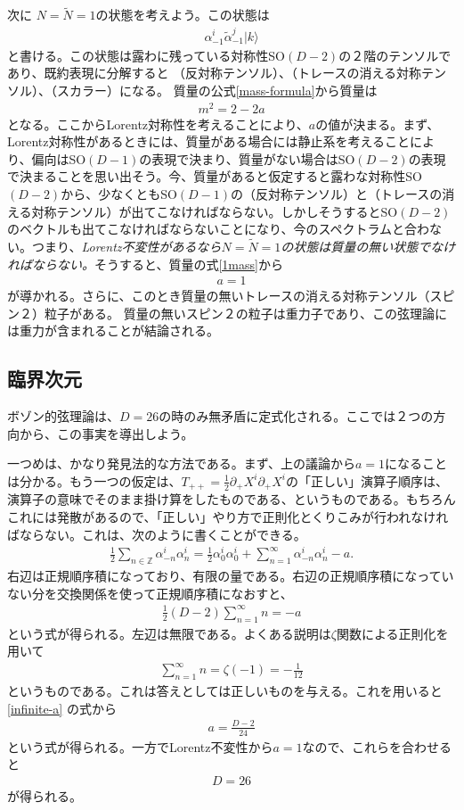 \documentclass[report,paper=a4, fontsize=12pt, line_length=16cm, number_of_lines=33,dvipdfmx]{jlreq}
\numberwithin{equation}{chapter}
\numberwithin{equation}{section}
\newcommand{\Zb}{\mathbb{Z}}
\newcommand{\del}{\partial}
\newcommand{\alphat}{\tilde{\alpha}}
\newcommand{\Nt}{\widetilde{N}}
\begin{document}
次に $N=\Nt=1$の状態を考えよう。この状態は
\begin{align}
\alpha^i_{-1}\alphat^{j}_{-1}|k\rangle
\end{align}
と書ける。この状態は露わに残っている対称性SO$(D-2)$の２階のテンソルであり、既約表現に分解すると
（反対称テンソル）、（トレースの消える対称テンソル）、（スカラー）になる。
質量の公式\eqref{mass-formula}から質量は
\begin{align}
m^2=2-2a\label{1mass}
\end{align}
となる。ここからLorentz対称性を考えることにより、$a$の値が決まる。まず、Lorentz対称性があるときには、質量がある場合には静止系を考えることにより、偏向はSO$(D-1)$の表現で決まり、質量がない場合はSO$(D-2)$の表現で決まることを思い出そう。今、質量があると仮定すると露わな対称性SO$(D-2)$から、少なくともSO$(D-1)$の（反対称テンソル）と（トレースの消える対称テンソル）が出てこなければならない。しかしそうするとSO$(D-2)$のベクトルも出てこなければならないことになり、今のスペクトラムと合わない。つまり、{\em Lorentz不変性があるなら$N=\Nt=1$の状態は質量の無い状態でなければならない。}そうすると、質量の式\eqref{1mass}から
\begin{align}
a=1
\end{align}
が導かれる。さらに、このとき質量の無いトレースの消える対称テンソル（スピン２）粒子がある。
質量の無いスピン２の粒子は重力子であり、この弦理論には重力が含まれることが結論される。

\subsection{臨界次元}
ボゾン的弦理論は、$D=26$の時のみ無矛盾に定式化される。ここでは２つの方向から、この事実を導出しよう。

一つめは、かなり発見法的な方法である。まず、上の議論から$a=1$になることは分かる。もう一つの仮定は、$T_{++}=\frac12 \del_{+}X^i\del_{+}X^i$の「正しい」演算子順序は、演算子の意味でそのまま掛け算をしたものである、というものである。もちろんこれには発散があるので、「正しい」やり方で正則化とくりこみが行われなければならない。これは、次のように書くことができる。
\begin{align}
\frac12\sum_{n\in \Zb}\alpha^i_{-n}\alpha^i_{n}=\frac12 \alpha^i_0\alpha^i_0+\sum_{n=1}^{\infty}\alpha^i_{-n}\alpha^i_{n}-a.
\end{align}
右辺は正規順序積になっており、有限の量である。右辺の正規順序積になっていない分を交換関係を使って正規順序積になおすと、
\begin{align}
\frac12(D-2)\sum_{n=1}^{\infty} n=-a\label{infinite-a}
\end{align}
という式が得られる。左辺は無限である。よくある説明は$\zeta$関数による正則化を用いて
\begin{align}
\sum_{n=1}^{\infty}n=\zeta(-1)=-\frac{1}{12}
\end{align}
というものである。これは答えとしては正しいものを与える。これを用いると\eqref{infinite-a}
の式から
\begin{align}
a=\frac{D-2}{24}
\end{align}
という式が得られる。一方でLorentz不変性から$a=1$なので、これらを合わせると
\begin{align}
D=26
\end{align}
が得られる。
\end{document}
